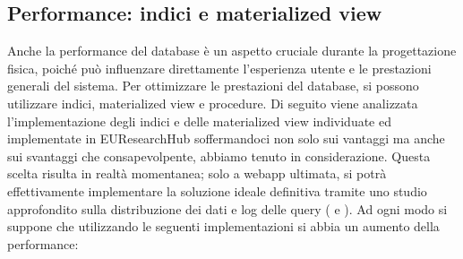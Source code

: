 \documentclass{report}
\begin{document}
\subsection{Performance: indici e  materialized view }
Anche la performance del database è un aspetto cruciale durante la progettazione fisica, poiché può influenzare direttamente l'esperienza utente e le prestazioni generali del sistema. Per ottimizzare le prestazioni del database, si possono utilizzare indici, materialized view e procedure. Di seguito viene analizzata l'implementazione degli indici e delle materialized view individuate ed implementate in EUResearchHub soffermandoci non solo sui vantaggi ma anche sui svantaggi che consapevolpente, abbiamo tenuto in considerazione.  Questa scelta risulta in realtà momentanea; solo a webapp ultimata, si potrà effettivamente implementare la soluzione ideale definitiva tramite uno studio approfondito sulla distribuzione dei dati e log delle query (  e ). 
Ad ogni modo si suppone che utilizzando le seguenti implementazioni si abbia un aumento della performance:
\end{document}
